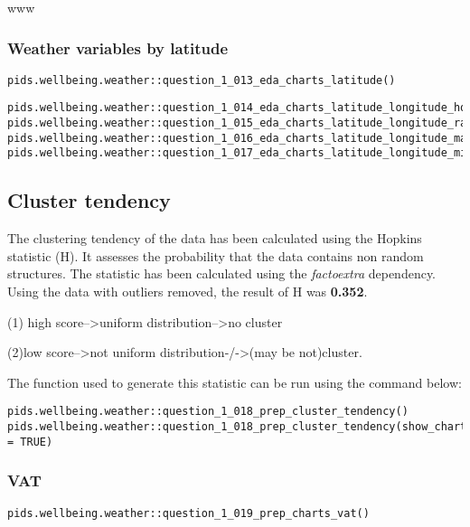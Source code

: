 www\documentclass[12pt, oneside, openany]{book}
\begin{document}
\subsubsection*{Weather variables by latitude}

\begin{verbatim}
pids.wellbeing.weather::question_1_013_eda_charts_latitude()
\end{verbatim}

\begin{verbatim}
pids.wellbeing.weather::question_1_014_eda_charts_latitude_longitude_hours_sun()
pids.wellbeing.weather::question_1_015_eda_charts_latitude_longitude_rain_mm()
pids.wellbeing.weather::question_1_016_eda_charts_latitude_longitude_max_temp()
pids.wellbeing.weather::question_1_017_eda_charts_latitude_longitude_min_temp()
\end{verbatim}

\subsection*{Cluster tendency}

The clustering tendency of the data has been calculated using the Hopkins statistic (H). It assesses the probability that the data contains non random structures. The statistic has been calculated using the \emph{factoextra} dependency. Using the data with outliers removed, the result of H was \textbf{0.352}. 

(1) high score-->uniform distribution-->no cluster

(2)low score-->not uniform distribution-/->(may be not)cluster. 


The function used to generate this statistic can be run using the command below:
\begin{verbatim}
pids.wellbeing.weather::question_1_018_prep_cluster_tendency()
pids.wellbeing.weather::question_1_018_prep_cluster_tendency(show_chart = TRUE)
\end{verbatim}

\subsubsection*{VAT}

\begin{verbatim}
pids.wellbeing.weather::question_1_019_prep_charts_vat()
\end{verbatim}
\end{document}
